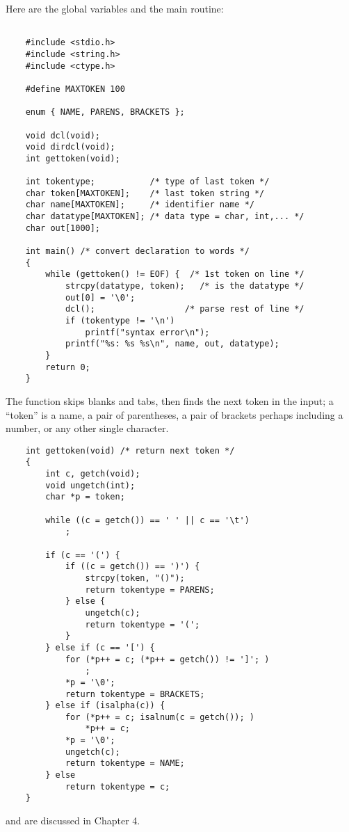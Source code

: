 Here are the global variables and the main routine:
\begin{lstlisting}

    #include <stdio.h>
    #include <string.h>
    #include <ctype.h>

    #define MAXTOKEN 100

    enum { NAME, PARENS, BRACKETS };

    void dcl(void);
    void dirdcl(void);
    int gettoken(void);

    int tokentype;           /* type of last token */
    char token[MAXTOKEN];    /* last token string */
    char name[MAXTOKEN];     /* identifier name */
    char datatype[MAXTOKEN]; /* data type = char, int,... */
    char out[1000];

    int main() /* convert declaration to words */
    {
        while (gettoken() != EOF) {  /* 1st token on line */
            strcpy(datatype, token);   /* is the datatype */
            out[0] = '\0';
            dcl();                  /* parse rest of line */
            if (tokentype != '\n')
                printf("syntax error\n");
            printf("%s: %s %s\n", name, out, datatype);
        }
        return 0;
    }

\end{lstlisting}

The function  skips blanks and tabs, then finds the next token in the input; a ``token'' is a name, a pair of parentheses, a pair of brackets perhaps including a number, or any other single character.
\begin{lstlisting}
    int gettoken(void) /* return next token */
    {
        int c, getch(void);
        void ungetch(int);
        char *p = token;

        while ((c = getch()) == ' ' || c == '\t')
            ;

        if (c == '(') {
            if ((c = getch()) == ')') {
                strcpy(token, "()");
                return tokentype = PARENS;
            } else {
                ungetch(c);
                return tokentype = '(';
            }
        } else if (c == '[') {
            for (*p++ = c; (*p++ = getch()) != ']'; )
                ;
            *p = '\0';
            return tokentype = BRACKETS;
        } else if (isalpha(c)) {
            for (*p++ = c; isalnum(c = getch()); )
                *p++ = c;
            *p = '\0';
            ungetch(c);
            return tokentype = NAME;
        } else
            return tokentype = c;
    }
\end{lstlisting}
 and  are discussed in Chapter 4.

